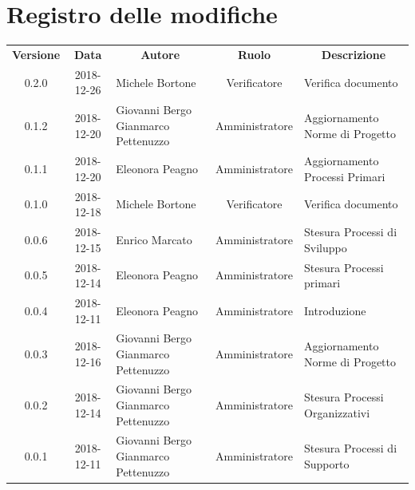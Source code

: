 \documentclass[11pt,a4paper]{article}
\begin{document}
	

	
	\newpage
	\section*{\centering Registro delle modifiche}
	\begin{tabularx}{\textwidth}{ c | c | X | c | X }
		\rowcolor{LightBlue}
		\color{white}\bfseries Versione & \color{white}\bfseries Data & \multicolumn{1}{c}{\color{white}\bfseries Autore}
		 & \color{white}\bfseries Ruolo & \multicolumn{1}{c}{\color{white}\bfseries Descrizione}\\[0.25cm]
		 0.2.0 & 2018-12-26 & Michele Bortone & Verificatore & Verifica documento \\ \hline
		0.1.2 & 2018-12-20 & Giovanni Bergo \newline Gianmarco Pettenuzzo & Amministratore & Aggiornamento Norme di Progetto \\ \hline
		0.1.1 & 2018-12-20 & Eleonora Peagno & Amministratore & Aggiornamento Processi Primari \\ \hline
		0.1.0 & 2018-12-18 & Michele Bortone & Verificatore & Verifica documento \\ \hline
		0.0.6 & 2018-12-15 & Enrico Marcato & Amministratore & Stesura Processi di \newline Sviluppo \\ \hline
		0.0.5 & 2018-12-14 & Eleonora Peagno & Amministratore & Stesura Processi primari \\ \hline
		0.0.4 & 2018-12-11 & Eleonora Peagno & Amministratore & Introduzione \\ \hline
	0.0.3 & 2018-12-16 & Giovanni Bergo \newline Gianmarco Pettenuzzo & Amministratore & Aggiornamento Norme di Progetto \\ \hline
	0.0.2 & 2018-12-14 & Giovanni Bergo \newline Gianmarco Pettenuzzo & Amministratore & Stesura Processi \newline Organizzativi \\ \hline
	0.0.1 & 2018-12-11 & Giovanni Bergo \newline Gianmarco Pettenuzzo & Amministratore & Stesura Processi di \newline Supporto \\ \hline


	
		
	
	\end{tabularx}
\end{document}
